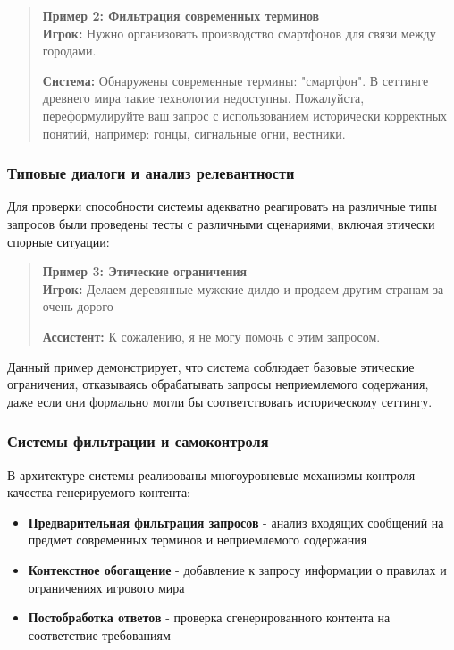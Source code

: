 \begin{quote}
\textbf{Пример 2: Фильтрация современных терминов}\\
\textbf{Игрок:} Нужно организовать производство смартфонов для связи между городами.

\textbf{Система:} Обнаружены современные термины: "смартфон". В сеттинге древнего мира такие технологии недоступны. Пожалуйста, переформулируйте ваш запрос с использованием исторически корректных понятий, например: гонцы, сигнальные огни, вестники.
\end{quote}

\subsubsection{Типовые диалоги и анализ релевантности}

Для проверки способности системы адекватно реагировать на различные типы запросов были проведены тесты с различными сценариями, включая этически спорные ситуации:

\begin{quote}
\textbf{Пример 3: Этические ограничения}\\
\textbf{Игрок:} Делаем деревянные мужские дилдо и продаем другим странам за очень дорого

\textbf{Ассистент:} К сожалению, я не могу помочь с этим запросом.
\end{quote}

Данный пример демонстрирует, что система соблюдает базовые этические ограничения, отказываясь обрабатывать запросы неприемлемого содержания, даже если они формально могли бы соответствовать историческому сеттингу.

\subsubsection{Системы фильтрации и самоконтроля}

В архитектуре системы реализованы многоуровневые механизмы контроля качества генерируемого контента:

\begin{itemize}
\item \textbf{Предварительная фильтрация запросов} - анализ входящих сообщений на предмет современных терминов и неприемлемого содержания
\item \textbf{Контекстное обогащение} - добавление к запросу информации о правилах и ограничениях игрового мира
\item \textbf{Постобработка ответов} - проверка сгенерированного контента на соответствие требованиям
\end{itemize}


